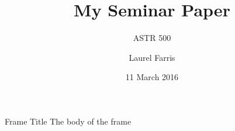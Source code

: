 \documentclass{beamer}
\title{My Seminar Paper}
\subtitle{ASTR 500}
\date{11 March 2016}
\author{Laurel Farris}
\begin{document}
\begin{frame}
    \titlepage
\end{frame}

\begin{frame}{Frame Title}
    The body of the frame
\end{frame}
\end{document}
